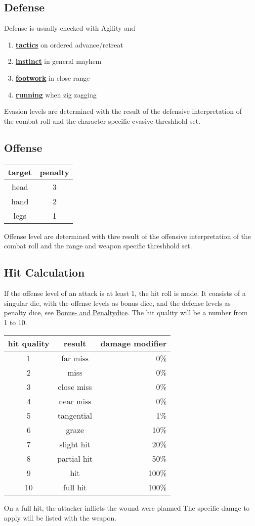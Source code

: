 \subsection{Defense}\label{subsec:defense}
Defense is usually checked with Agility and
\begin{enumerate}[label = - ]
    \item \hyperref[subsec:tactics]{\textbf{tactics}} on ordered advance/retreat
    \item \hyperref[subsec:instinct]{\textbf{instinct}} in general mayhem
    \item \hyperref[subsec:footwork]{\textbf{footwork}} in close range
    \item \hyperref[subsec:running]{\textbf{running}} when zig zagging
\end{enumerate}
Evasion levels are determined with the result of the defensive interpretation of the combat roll
and the character specific evasive threshhold set.

\subsection{Offense}\label{subsec:offense}
\begin{tabular}{cc}
    target & penalty\\\hline
    head & 3 \\
    hand & 2 \\
    legs & 1 \\
\end{tabular}
Offense level are determined with thre result of the offensive interpretation of the combat roll and the range and
weapon specific threshhold set.

\subsection{Hit Calculation}\label{subsec:hit}
If the offense level of an attack is at least 1, the hit roll is made.
It consists of a singular die, with the offense levels as bonus dice, and the defense levels as penalty dice,
see \hyperref[sec:bonus--and-penaltydice]{Bonus- and Penaltydice}.
The hit quality will be a number from 1 to 10.
\begin{tabular}{c|cr}
    hit quality & result & damage modifier \\\hline
    1 & far miss & 0\%\\
    2 & miss& 0\%\\
    3 & close miss& 0\%\\
    4 & near miss& 0\%\\
    5 & tangential& 1\%\\
    6 & graze& 10\%\\
    7 & slight hit& 20\%\\
    8 & partial hit& 50\%\\
    9 & hit& 100\%\\
    10 & full hit& 100\%\\
\end{tabular}

On a full hit, the attacker inflicts the wound were planned
The specific damge to apply will be listed with the weapon.
